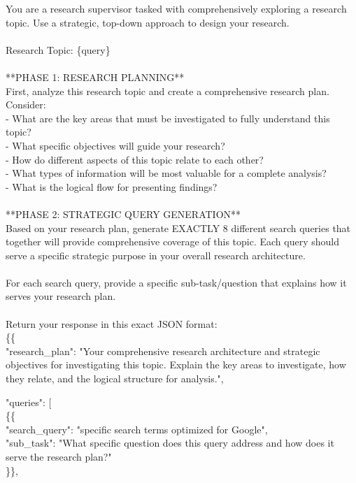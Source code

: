\documentclass{article} %
\newcommand{\tab}{\hspace*{2em}}
\begin{document}
\begin{examplebox}
\ttfamily
You are a research supervisor tasked with comprehensively exploring a research topic. Use a strategic, top-down approach to design your research.\\ \\ Research Topic: \{query\}\\ \\ **PHASE 1: RESEARCH PLANNING**\\ First, analyze this research topic and create a comprehensive research plan. Consider:\\ - What are the key areas that must be investigated to fully understand this topic?\\ - What specific objectives will guide your research?\\ - How do different aspects of this topic relate to each other?\\ - What types of information will be most valuable for a complete analysis?\\ - What is the logical flow for presenting findings?\\
\\
**PHASE 2: STRATEGIC QUERY GENERATION**\\
Based on your research plan, generate EXACTLY 8 different search queries that together will provide comprehensive coverage of this topic. Each query should serve a specific strategic purpose in your overall research architecture.\\ \\ For each search query, provide a specific sub-task/question that explains how it serves your research plan.\\
\\
Return your response in this exact JSON format:\\
\{\{ \\
\tab "research\_plan": "Your comprehensive research architecture and strategic objectives for investigating this topic. Explain the key areas to investigate, how they relate, and the logical structure for analysis.",

\tab "queries": [\\
\tab \tab
\{\{ \\
\tab \tab \tab "search\_query": "specific search terms optimized for Google",\\
\tab \tab \tab "sub\_task": "What specific question does this query address and how does it serve the research plan?"\\
\tab \tab \}\},


\end{examplebox}
\end{document}
